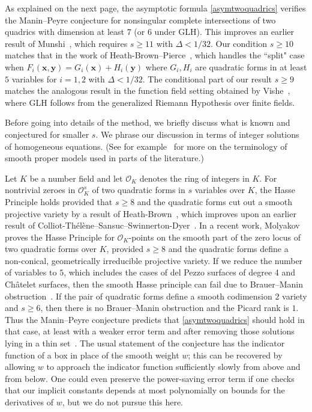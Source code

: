 \documentclass[letterpaper,11pt]{amsart}
\numberwithin{equation}{section}
\theoremstyle{definition}
\numberwithin{equation}{section}
\begin{document}
As explained on the next page, the asymptotic formula \eqref{asymtwoquadrics} verifies the Manin--Peyre conjecture for nonsingular complete intersections of two quadrics with dimension at least $7$ (or $6$ under GLH). This improves an earlier result of Munshi~\cite{M}, which requires $s\geq 11$ with  $\Delta <1/32$.
Our condition $s\geq 10$
 matches that in the work of Heath-Brown--Pierce~\cite{HBP}, which handles the ``split" case when $F_i(\mathbf x,\mathbf y)=G_i(\mathbf x)+H_i(\mathbf y)$ where $G_i,H_i$ are quadratic forms in at least $5$ variables for $i=1,2$ with $\Delta<1/32$.
The conditional part of our result $s\geq 9$ matches the analogous result in the function field setting obtained by Vishe~\cite{V19}, where GLH follows from the generalized Riemann Hypothesis over finite fields. 

Before going into details of the method, we briefly discuss what is known and conjectured for smaller $s$. We phrase our discussion in terms of integer solutions of homogeneous equations. (See for example~\cite{JL} for more on the terminology of smooth proper models used in parts of the literature.)

Let $K$ be a number field and let $\mathcal O_K$ denotes the ring of integers in $K$. 
For nontrivial zeroes in $\mathcal O_K^s$ of two quadratic forms in $s$ variables over $K$, the Hasse Principle holds provided that $s\geq 8$ and the quadratic forms cut out a smooth projective variety by a result of Heath-Brown~\cite{HBHasse}, which  improves upon an earlier result of Colliot-Th\'{e}l\`ene--Sansuc--Swinnerton-Dyer~\cite{CSS}. In a recent work, Molyakov~\cite{Molyakov} proves the Hasse Principle for $\mathcal O_K$-points on the smooth part of the zero locus of two quadratic forms over $K$, provided $s\geq 8$ and the quadratic forms define a non-conical, geometrically irreducible projective variety. If we reduce the number of variables to $5$, which includes the cases of del Pezzo surfaces of degree 4 and Ch\^atelet surfaces, then the smooth Hasse principle can fail due to Brauer--Manin obstruction~\cite[Example 15.5]{CSS}. If the pair of quadratic forms define a smooth codimension $2$ variety and $s\geq 6$, then there is no Brauer--Manin obstruction and the Picard rank is $1$. Thus the Manin--Peyre conjecture predicts that \eqref{asymtwoquadrics} should hold in that case, at least with a weaker error term and after removing those solutions lying in a thin set~\cite{LST}.
The usual statement of the conjecture has the indicator function of a box in place of the smooth weight $w$; this can be recovered by allowing $w$ to approach the indicator function sufficiently slowly from above and from below. One could even preserve the power-saving error term if one checks that our implicit constants depends at most polynomially on bounds for the derivatives of $w$, but we do not pursue this here.
\end{document}
